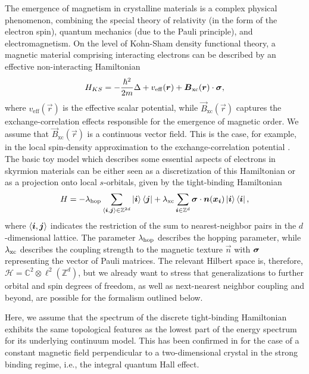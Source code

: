 \documentclass[submission, Phys]{SciPost}
\begin{document}
The emergence of magnetism in crystalline materials is a complex physical phenomenon, combining the special theory of relativity (in the form of the electron spin), quantum mechanics (due to the Pauli principle), and electromagnetism.
On the level of Kohn-Sham density functional theory, a magnetic material comprising interacting electrons can be described by an
effective non-interacting Hamiltonian~
\cite{Kohn1965,VonBarth1972}
\begin{align}
    H_{KS}= - \frac{\hbar^2}{2 m} \Delta  +  v_{\mathrm{eff}} (\boldsymbol{r}) + \boldsymbol{B}_{\mathrm{xc}}(\boldsymbol{r}) \cdot \boldsymbol{\sigma} ,
\end{align}
where $v_{\mathrm{eff}} (\vec{r})$ is the effective scalar potential, while $\vec{B}_{\mathrm{xc}}(\vec{r})$ captures the exchange-correlation effects responsible for the emergence of magnetic order.
We assume that $\vec{B}_{\mathrm{xc}}(\vec{r})$ is a continuous vector field.
This is the case, for example, in the local spin-density approximation to the exchange-correlation potential \cite{VonBarth1972}.
The basic toy model which describes some essential aspects of electrons in skyrmion materials can be either seen as a discretization of this Hamiltonian or as a projection onto local $s$-orbitals, given by the tight-binding Hamiltonian
\begin{equation}
    H =  -\lambda_\mathrm{hop} \sum_{\braket{\boldsymbol{i},\boldsymbol{j}} \in \mathbb{Z}^{2d}}  \ket{\boldsymbol{i}}\bra{\boldsymbol{j}} + \lambda_\mathrm{xc}  \sum_{\boldsymbol{i}\in \mathbb{Z}^d} \boldsymbol{\sigma} \cdot \boldsymbol{n}(\boldsymbol{x}_{\boldsymbol{i}})   \ket{\boldsymbol{i}}\bra{\boldsymbol{i}},
    \label{eq:tbHamiltonian}
\end{equation}
where $\braket{\boldsymbol{i},\boldsymbol{j}}$ indicates the restriction of the sum to nearest-neighbor pairs in the $d$-dimensional lattice. The parameter $\lambda_\mathrm{hop}$ describes the hopping parameter, while $\lambda_\mathrm{xc}$ describes the coupling strength to the magnetic texture $\vec{n}$ with $\boldsymbol{\sigma}$ representing the vector of Pauli matrices.
The relevant Hilbert space is, therefore, $\mathcal{H}=\mathbb{C}^2 \otimes \ell^2(\mathbb{Z}^d)$, but we already want to stress that generalizations to further orbital and spin degrees of freedom, as well as next-nearest neighbor coupling and beyond, are possible for the formalism outlined below.

Here, we assume that the spectrum of the discrete tight-binding Hamiltonian exhibits the same topological features as the lowest part of the energy spectrum for its underlying continuum model. This has been confirmed in \cite{Shapiro2022} for the case of a constant magnetic field perpendicular to a two-dimensional crystal in the strong binding regime, i.e., the integral quantum Hall effect.
\end{document}
